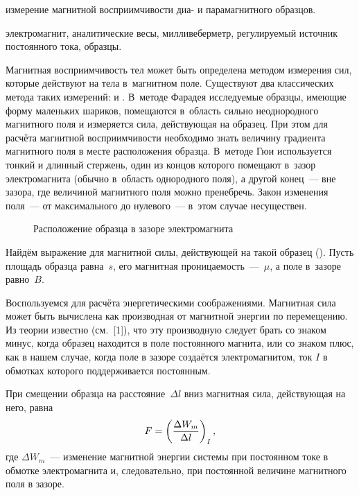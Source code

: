 
\begin{lab:aim}
	измерение магнитной восприимчивости диа- и парамагнитного образцов.
\end{lab:aim}

\begin{lab:equipment}
	электромагнит, аналитические весы, милливеберметр,  регулируемый источник постоянного тока, образцы.
\end{lab:equipment}

Магнитная восприимчивость тел может быть определена методом измерения сил, которые действуют на тела в~магнитном поле.
Существуют два классических метода таких измерений:  и . В~методе Фарадея
исследуемые образцы, имеющие форму маленьких шариков, помещаются в~область сильно неоднородного магнитного поля и
измеряется сила, действующая на образец. При этом для расчёта магнитной восприимчивости необходимо знать величину
градиента магнитного поля в месте расположения образца. В~методе Гюи используется тонкий и длинный стержень, один из
концов которого помещают в~зазор электромагнита (обычно в~область однородного поля), а другой конец~--- вне зазора, где
величиной магнитного поля можно пренебречь. Закон изменения поля~--- от максимального до нулевого~--- в~этом случае
несуществен.

\begin{wrapfigure}{r}{0.4\textwidth}
	\caption{Расположение образца в зазоре электромагнита}
\end{wrapfigure}

Найдём выражение для магнитной силы, действующей на такой образец (). Пусть площадь образца равна~$s$, его магнитная
проницаемость~---~$\mu$, а поле в~зазоре равно~$B$.

Воспользуемся для расчёта энергетическими соображениями. Магнитная сила может быть вычислена как производная от
магнитной энергии по перемещению. Из теории известно (см.~[1]), что эту производную следует брать со знаком минус, когда
образец находится в поле постоянного магнита, или со знаком плюс, как в нашем случае, когда поле в зазоре создаётся
электромагнитом, ток $I$ в обмотках которого поддерживается постоянным.

При смещении образца на расстояние~$\Delta l$ вниз магнитная сила, действующая на него, равна
\begin{equation}%
	\eqmark{force}
	F=\left(\frac{\Delta W_m}{\Delta l}\right)_I,
\end{equation}
где $\Delta W_m$~--- изменение магнитной энергии системы при постоянном токе в обмотке электромагнита и, следовательно, при
постоянной величине магнитного поля в зазоре.

